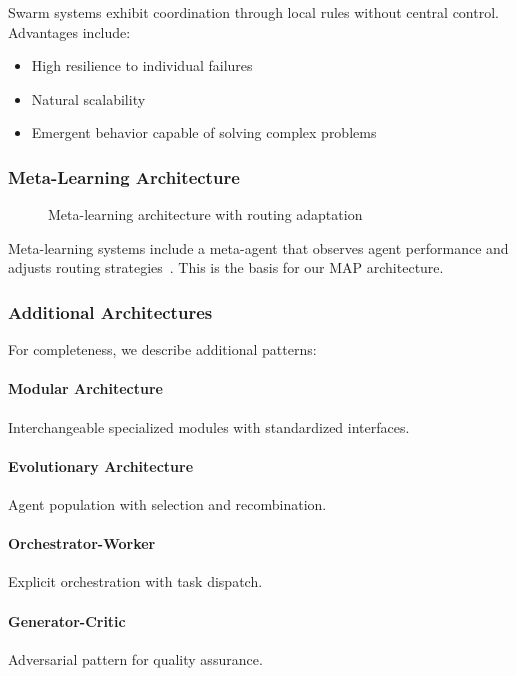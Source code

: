 \documentclass[11pt,a4paper]{article}
\theoremstyle{definition}
\theoremstyle{remark}
\newcommand{\map}{\textsc{MAP}\xspace}
\begin{document}
Swarm systems exhibit coordination through local rules without central control. Advantages include:
\begin{itemize}
    \item High resilience to individual failures
    \item Natural scalability
    \item Emergent behavior capable of solving complex problems
\end{itemize}

\subsubsection{Meta-Learning Architecture}

\begin{figure}[H]
    \centering
    
    \caption{Meta-learning architecture with routing adaptation}
    \label{fig:meta-learning}
\end{figure}

Meta-learning systems include a meta-agent that observes agent performance and adjusts routing strategies~\cite{wu2023autogen,hong2023metagpt}. This is the basis for our \map architecture.

\subsubsection{Additional Architectures}

For completeness, we describe additional patterns:

\paragraph{Modular Architecture} Interchangeable specialized modules with standardized interfaces.

\paragraph{Evolutionary Architecture} Agent population with selection and recombination.

\paragraph{Orchestrator-Worker} Explicit orchestration with task dispatch.

\paragraph{Generator-Critic} Adversarial pattern for quality assurance.
\end{document}
